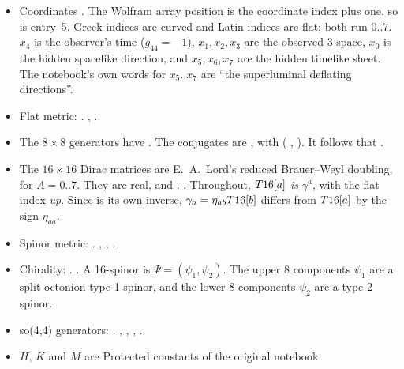 \begin{itemize}
  \item Coordinates . The Wolfram array position is the coordinate
    index plus one, so  is entry~5. Greek indices are curved and Latin indices are flat;
    both run $0..7$. $x_4$ is the observer's time ($g_{44}=-1$), $x_1,x_2,x_3$ are the observed
    3-space, $x_0$ is the hidden spacelike direction, and $x_5,x_6,x_7$ are the hidden timelike
    sheet. The notebook's own words for $x_5..x_7$ are ``the superluminal deflating directions''.
  \item Flat metric: . 
    , .
  \item The $8\times8$ generators have . The conjugates are
    , with
     ( ,
    ). It follows that .
  \item The $16\times16$ Dirac matrices are E.~A.~Lord's reduced Brauer--Weyl doubling,
     for $A=0..7$. They are real, and
    . 
    . Throughout, $T16[a]$ \emph{is}
    $\gamma^a$, with the flat index \emph{up}. Since  is its own inverse,
    $\gamma_a=\eta_{ab}T16[b]$ differs from $T16[a]$ by the sign $\eta_{aa}$.
  \item Spinor metric: . 
    ,
    ,
    .
  \item Chirality: . 
    .
    A 16-spinor is $\Psi=(\psi_1,\psi_2)$. The upper 8 components $\psi_1$ are a split-octonion
    type-1 spinor, and the lower 8 components $\psi_2$ are a type-2 spinor.
  \item so(4,4) generators: .
     ,
    ,
    ,
    .
  \item $H$, $K$ and $M$ are Protected constants of the original notebook.
\end{itemize}

